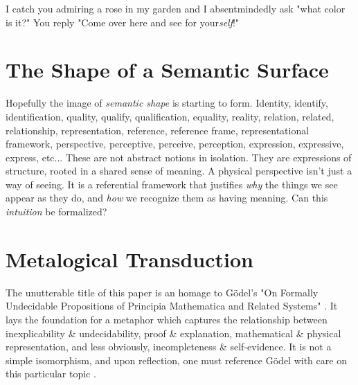 \documentclass[runningheads]{llncs}
\begin{document}
\begin{aexample}
I catch you admiring a rose in my garden and I absentmindedly ask "what color is it?" You reply "Come over here and see for your\emph{self}!"  
\end{aexample}


\section{The Shape of a Semantic Surface}

Hopefully the image of \emph{semantic shape} is starting to form. Identity, identify, identification, quality, qualify, qualification, equality, reality, relation, related, relationship, representation, reference, reference frame, representational framework, perspective, perceptive, perceive, perception, expression, expressive, express, etc... These are not abstract notions in isolation. They are expressions of structure, rooted in a shared sense of meaning. A physical perspective isn't just a way of seeing. It is a referential framework that justifies \emph{why} the things we see appear as they do, and \emph{how} we recognize them as having meaning. Can this \emph{intuition} be formalized? 


\section{Metalogical Transduction}

The unutterable title of this paper is an homage to Gödel's "On Formally Undecidable Propositions of Principia Mathematica and Related Systems" \cite{Gödel1962}\cite{Gödel1931}. It lays the foundation for a metaphor which captures the relationship between inexplicability \& undecidability, proof \& explanation, mathematical \& physical representation, and less obviously, incompleteness \& self-evidence. It is not a simple isomorphism, and upon reflection, one must reference Gödel with care on this particular topic \cite{Feferman1995}\cite{Feferman1991}.
\end{document}
